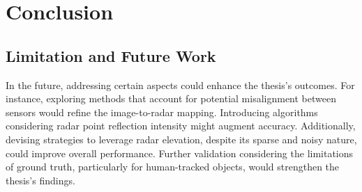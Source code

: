 
\chapter{Conclusion}\label{chap:conclusion}


\section{Limitation and Future Work}
In the future, addressing certain aspects could enhance the thesis's outcomes. 
For instance, exploring methods that account for potential misalignment between sensors would refine the image-to-radar mapping. 
Introducing algorithms considering radar point reflection intensity might augment accuracy. 
Additionally, devising strategies to leverage radar elevation, 
despite its sparse and noisy nature, could improve overall performance. 
Further validation considering the limitations of ground truth, 
particularly for human-tracked objects, would strengthen the thesis's findings.

